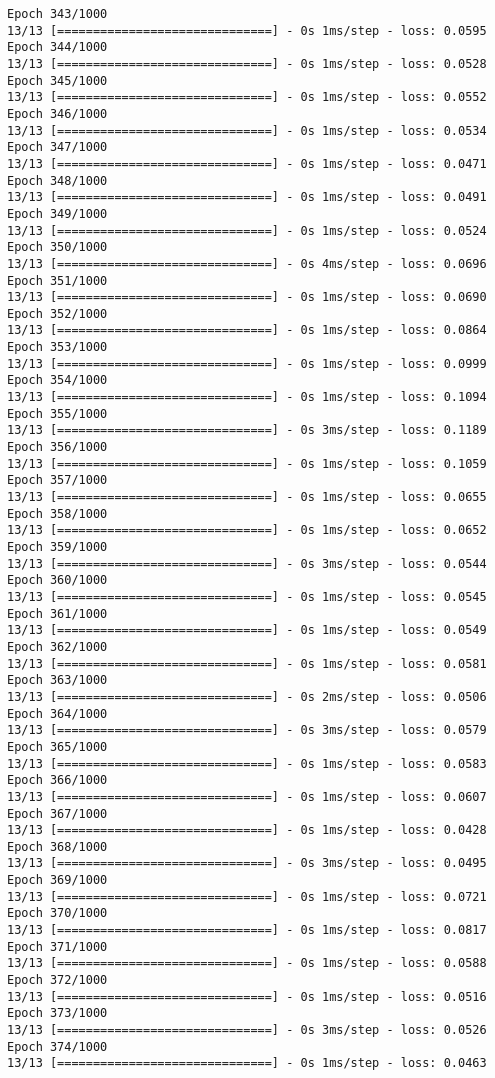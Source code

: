 \documentclass[11pt]{article}
\begin{document}
\begin{Verbatim}[commandchars=\\\{\}]
Epoch 343/1000
13/13 [==============================] - 0s 1ms/step - loss: 0.0595
Epoch 344/1000
13/13 [==============================] - 0s 1ms/step - loss: 0.0528
Epoch 345/1000
13/13 [==============================] - 0s 1ms/step - loss: 0.0552
Epoch 346/1000
13/13 [==============================] - 0s 1ms/step - loss: 0.0534
Epoch 347/1000
13/13 [==============================] - 0s 1ms/step - loss: 0.0471
Epoch 348/1000
13/13 [==============================] - 0s 1ms/step - loss: 0.0491
Epoch 349/1000
13/13 [==============================] - 0s 1ms/step - loss: 0.0524
Epoch 350/1000
13/13 [==============================] - 0s 4ms/step - loss: 0.0696
Epoch 351/1000
13/13 [==============================] - 0s 1ms/step - loss: 0.0690
Epoch 352/1000
13/13 [==============================] - 0s 1ms/step - loss: 0.0864
Epoch 353/1000
13/13 [==============================] - 0s 1ms/step - loss: 0.0999
Epoch 354/1000
13/13 [==============================] - 0s 1ms/step - loss: 0.1094
Epoch 355/1000
13/13 [==============================] - 0s 3ms/step - loss: 0.1189
Epoch 356/1000
13/13 [==============================] - 0s 1ms/step - loss: 0.1059
Epoch 357/1000
13/13 [==============================] - 0s 1ms/step - loss: 0.0655
Epoch 358/1000
13/13 [==============================] - 0s 1ms/step - loss: 0.0652
Epoch 359/1000
13/13 [==============================] - 0s 3ms/step - loss: 0.0544
Epoch 360/1000
13/13 [==============================] - 0s 1ms/step - loss: 0.0545
Epoch 361/1000
13/13 [==============================] - 0s 1ms/step - loss: 0.0549
Epoch 362/1000
13/13 [==============================] - 0s 1ms/step - loss: 0.0581
Epoch 363/1000
13/13 [==============================] - 0s 2ms/step - loss: 0.0506
Epoch 364/1000
13/13 [==============================] - 0s 3ms/step - loss: 0.0579
Epoch 365/1000
13/13 [==============================] - 0s 1ms/step - loss: 0.0583
Epoch 366/1000
13/13 [==============================] - 0s 1ms/step - loss: 0.0607
Epoch 367/1000
13/13 [==============================] - 0s 1ms/step - loss: 0.0428
Epoch 368/1000
13/13 [==============================] - 0s 3ms/step - loss: 0.0495
Epoch 369/1000
13/13 [==============================] - 0s 1ms/step - loss: 0.0721
Epoch 370/1000
13/13 [==============================] - 0s 1ms/step - loss: 0.0817
Epoch 371/1000
13/13 [==============================] - 0s 1ms/step - loss: 0.0588
Epoch 372/1000
13/13 [==============================] - 0s 1ms/step - loss: 0.0516
Epoch 373/1000
13/13 [==============================] - 0s 3ms/step - loss: 0.0526
Epoch 374/1000
13/13 [==============================] - 0s 1ms/step - loss: 0.0463

\end{Verbatim}
\end{document}
